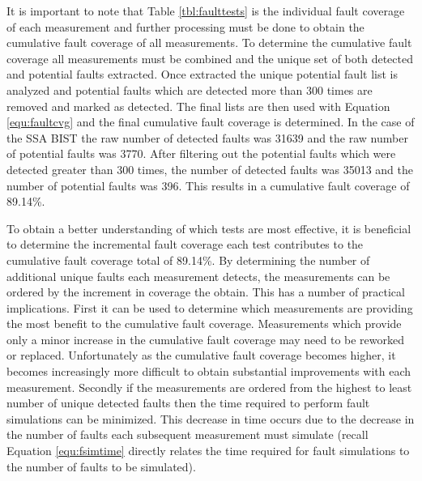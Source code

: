 \documentclass[12pt]{report}
\begin{document}
It is important to note that Table \ref{tbl:faulttests} is the individual fault coverage of each measurement and further processing must be done to obtain the cumulative fault coverage of all measurements.  To determine the cumulative fault coverage all measurements must be combined and the unique set of both detected and potential faults extracted.  Once extracted the unique potential fault list is analyzed and potential faults which are detected more than 300 times are removed and marked as detected.  The final lists are then used with Equation \ref{equ:faultcvg} and the final cumulative fault coverage is determined.  In the case of the SSA BIST the raw number of detected faults was 31639 and the raw number of potential faults was 3770.  After filtering out the potential faults which were detected greater than 300 times, the number of detected faults was 35013 and the number of potential faults was 396.  This results in a cumulative fault coverage of 89.14\%.  

To obtain a better understanding of which tests are most effective, it is beneficial to determine the incremental fault coverage each test contributes to the cumulative fault coverage total of 89.14\%.  By determining the number of additional unique faults each measurement detects, the measurements can be ordered by the increment in coverage the obtain.  This has a number of practical implications.  First it can be used to determine which measurements are providing the most benefit to the cumulative fault coverage.  Measurements which provide only a minor increase in the cumulative fault coverage may need to be reworked or replaced.  Unfortunately as the cumulative fault coverage becomes higher, it becomes increasingly more difficult to obtain substantial improvements with each measurement.  Secondly if the measurements are ordered from the highest to least number of unique detected faults then the time required to perform fault simulations can be minimized.  This decrease in time occurs due to the decrease in the number of faults each subsequent measurement must simulate (recall Equation \ref{equ:fsimtime} directly relates the time required for fault simulations to the number of faults to be simulated).
\end{document}
